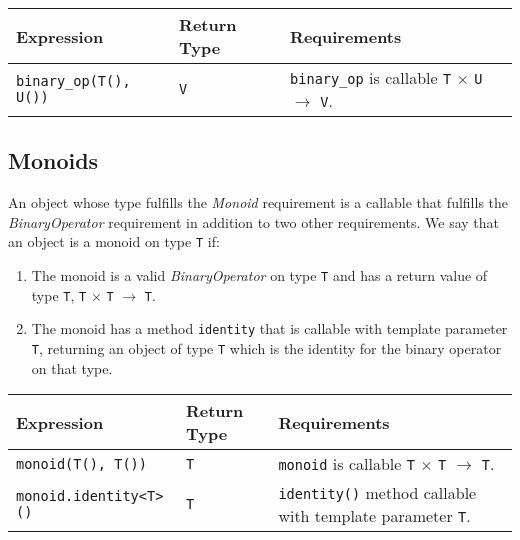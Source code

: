 \begin{tabularx}{\textwidth}{l l X}
\textbf{Expression} & \textbf{Return Type} & \textbf{Requirements}\\
\hline
\texttt{binary\_op(T(), U())} & \texttt{V} & \texttt{binary\_op} is callable \texttt{T} $\times$ \texttt{U} $\rightarrow$ \texttt{V}.\\
\end{tabularx}

\subsection{Monoids}
An object whose type fulfills the \textit{Monoid} requirement is a callable that
fulfills the \textit{BinaryOperator} requirement in addition to two other requirements.
We say that an object is a monoid on type \texttt{T} if:

\begin{enumerate}
   \item The monoid is a valid \textit{BinaryOperator} on type \texttt{T} and has a return value of type \texttt{T}, \texttt{T} $\times$ \texttt{T} $\rightarrow$ \texttt{T}.
   \item The monoid has a method \texttt{identity} that is callable with template parameter \texttt{T}, returning an object of type \texttt{T} which is the identity for the binary operator on that type.
\end{enumerate}

\begin{tabularx}{\textwidth}{l l X}
\textbf{Expression} & \textbf{Return Type} & \textbf{Requirements}\\
\hline
\texttt{monoid(T(), T())} & \texttt{T} & \texttt{monoid} is callable \texttt{T} $\times$ \texttt{T} $\rightarrow$ \texttt{T}.\\
\hline
\texttt{monoid.identity<T>()} & \texttt{T} & \texttt{identity()} method callable with template parameter \texttt{T}.\\
\end{tabularx}
